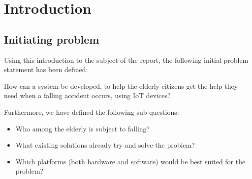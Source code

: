 \chapter*{Introduction}

\section{Initiating problem}
Using this introduction to the subject of the report, the following initial problem statement has been defined:

\begin{center}
    How can a system be developed, to help the elderly citizens get the help they need when a falling accident occurs, using IoT devices?
\end{center}

Furthermore, we have defined the following sub-questions:
\begin{itemize}
\item Who among the elderly is subject to falling?
\item What existing solutions already try and solve the problem?
\item Which platforms (both hardware and software) would be best suited for the problem?
\end{itemize}



